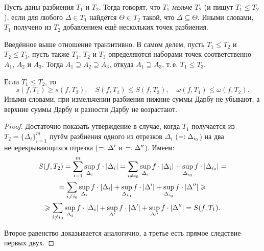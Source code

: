 \begin{definition}
    Пусть даны разбиения $T_1$ и $T_2$. Тогда говорят, что $T_1$ \textit{мельче} $T_2$ (и пишут $T_1 \leqslant T_2$), если для любого $\Delta \in T_1$ найдётся $\Theta \in T_2$ такой, что $\Delta \subseteq \Theta$. Иными словами, $T_1$ получено из $T_2$ добавлением ещё нескольких точек разбиения.
\end{definition}

Введённое выше отношение транзитивно. В самом делем, пусть $T_1 \leqslant T_2$ и $T_2 \leqslant T_3$, пусть также $T_1$, $T_2$ и $T_3$ определяются наборами точек соответственно $A_1$, $A_2$ и $A_3$. Тогда $A_1 \supseteq A_2 \supseteq A_3$, откуда $A_1 \supseteq A_3$, т.\,е. $T_1 \leqslant T_3$.

\begin{lemma}
    Если $T_1 \leqslant T_2$, то
    \[
        s(f, T_1) \geqslant s(f, T_2),\quad S(f, T_1) \leqslant S(f, T_2),\quad \omega(f, T_1) \leqslant \omega(f, T_2).
    \]
    Иными словами, при измельчении разбиения нижние суммы Дарбу не убывают, а верхние суммы Дарбу и разности Дарбу не возрастают.
\end{lemma}

\begin{proof}
    Достаточно показать утверждение в случае, когда $T_1$ получается из $T_2 = \{\Delta_i\}_{i = 1}^m$ путём разбиения одного из отрезков $\Delta_i$ ($= \vcentcolon \Delta_{i_0}$) на два неперекрывающихся отрезка ($= \vcentcolon \Delta^\prime$ и $= \vcentcolon \Delta^{\prime\prime}$). Имеем:
    \begin{multline*}
        S(f, T_2) = \sum_{i = 1}^m\sup\limits_{\Delta_i}f \cdot \left\lvert\Delta_i\right\rvert = \sum_{i \ne i_0}\sup\limits_{\Delta_i}f \cdot \left\lvert\Delta_i\right\rvert + \sup\limits_{\Delta_{i_0}}f \cdot \left\lvert\Delta_{i_0}\right\rvert =\\ = \sum_{i \ne i_0}\sup\limits_{\Delta_i}f \cdot \left\lvert\Delta_i\right\rvert + \sup\limits_{\Delta_{i_0}}f \cdot \left\lvert\Delta^\prime\right\rvert + \sup\limits_{\Delta_{i_0}}f \cdot \left\lvert\Delta^{\prime\prime}\right\rvert \geqslant\\ \geqslant \sum_{i \ne i_0}\sup\limits_{\Delta_i}f \cdot \left\lvert\Delta_i\right\rvert + \sup\limits_{\Delta^\prime}f \cdot \left\lvert\Delta^\prime\right\rvert + \sup\limits_{\Delta^{\prime\prime}}f \cdot \left\lvert\Delta^{\prime\prime}\right\rvert = S(f, T_1).
    \end{multline*}

    Второе равенство доказывается аналогично, а третье есть прямое следствие первых двух.
\end{proof}

